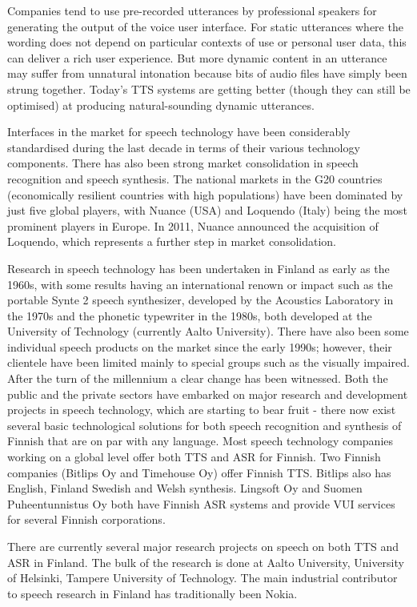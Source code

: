 \documentclass{../../metanetpaper}
\begin{document}
\begin{Parallel}[c]{79mm}{78mm}
{Companies tend to use pre-recorded utterances by professional speakers for
generating the output of the voice user interface. For static utterances where
the wording does not depend on particular contexts of use or personal user
data, this can deliver a rich user experience. But more dynamic content in an
utterance may suffer from unnatural intonation because bits of audio files have
simply been strung together. Today’s TTS systems are getting better (though
they can still be optimised) at producing natural-sounding dynamic utterances.

Interfaces in the market for speech technology have been
considerably standardised during the last decade in terms of their various
technology components. There has also been strong market consolidation in
speech recognition and speech synthesis. The national markets in the G20
countries (economically resilient countries with high populations) have been
dominated by just five global players, with Nuance (USA) and Loquendo (Italy)
being the most prominent players in Europe. In 2011, Nuance announced the
acquisition of Loquendo, which represents a further step in market
consolidation.

Research in speech technology has been undertaken in Finland as early as the
1960s, with some results having an international renown or impact such as the
portable Synte 2 speech synthesizer, developed by the Acoustics Laboratory in
the 1970s and the phonetic typewriter in the 1980s, both developed at the
University of Technology (currently Aalto University). There have also been
some individual speech products on the market since the early 1990s; however,
their clientele have been limited mainly to special groups such as the visually
impaired. After the turn of the millennium a clear change has been witnessed.
Both the public and the private sectors have embarked on major research and
development projects in speech technology, which are starting to bear fruit -
there now exist several basic technological solutions for both speech
recognition and synthesis of Finnish that are on par with any language. Most
speech technology companies working on a global level offer both TTS and ASR
for Finnish. Two Finnish companies (Bitlips Oy and Timehouse Oy) offer Finnish
TTS. Bitlips also has English, Finland Swedish and Welsh synthesis. Lingsoft Oy
and Suomen Puheentunnistus Oy both have Finnish ASR systems and provide VUI
services for several Finnish corporations.

There are currently several major research projects on speech on both TTS and
ASR in Finland. The bulk of the research is done at Aalto University,
University of Helsinki, Tampere University of Technology. The main industrial
contributor to speech research in Finland has traditionally been Nokia.

}
\end{Parallel}
\end{document}
